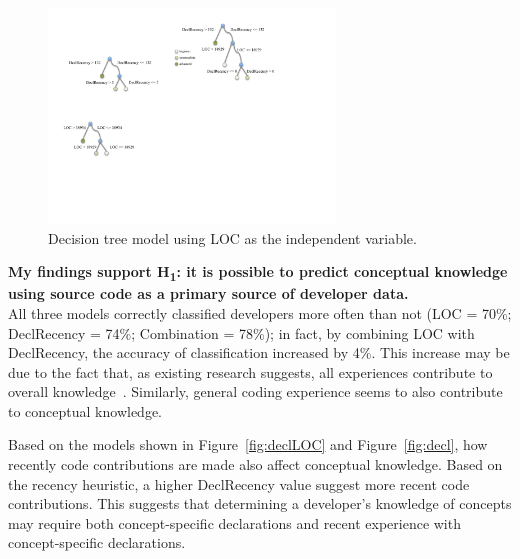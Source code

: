 \documentclass{llncs}
\begin{document}
\begin{figure} [h]
	\centering
	\includegraphics[width=3in]{figs/LOC.pdf}
	\caption{Decision tree model using LOC as the independent variable.}
	\label{fig:LOC}
\end{figure}

\noindent\textbf{My findings support H\textsubscript{1}: it is possible to predict conceptual knowledge using source code as a primary source of developer data.}\\
All three models correctly classified developers more often than not (LOC = 70\%; DeclRecency = 74\%; Combination = 78\%); in fact, by combining LOC with DeclRecency, the accuracy of classification increased by 4\%. This increase may be due to the fact that, as existing research suggests, all experiences contribute to overall knowledge~\cite{argote2011organizational,raju1995differential}. Similarly, general coding experience seems to also contribute to conceptual knowledge.

Based on the models shown in Figure~\ref{fig:declLOC} and Figure~\ref{fig:decl}, how recently code contributions are made also affect conceptual knowledge. Based on the recency heuristic, a higher DeclRecency value suggest more recent code contributions. This suggests that determining a developer's knowledge of concepts may require both concept-specific declarations and recent experience with concept-specific declarations. 


\vspace{0.5em}
\end{document}
